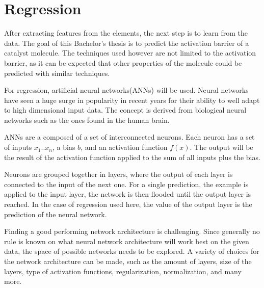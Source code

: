 
\chapter{Regression}
\label{ch:Regression}

After extracting features from the elements, the next step is to learn from the data.
The goal of this Bachelor's thesis is to predict the activation barrier of a catalyst molecule.
The techniques used however are not limited to the activation barrier, 
as it can be expected that other properties of the molecule could be predicted with similar techniques.

For regression, artificial neural networks(ANNs) will be used.
Neural networks have seen a huge surge in popularity in recent years for their ability to well
adapt to high dimensional input data.
The concept is derived from biological neural networks such as the ones found in the human brain.

ANNs are a composed of a set of interconnected neurons.
Each neuron has a set of inputs $x_1 .. x_n$, a bias $b$, and an activation function $f(x)$.
The output will be the result of the activation function applied to the sum of all inputs plus the bias.

Neurons are grouped together in layers, where the output of each layer is connected to the input of the next one.
For a single prediction, the example is applied to the input layer, the network is then flooded until the output layer is reached.
In the case of regression used here, the value of the output layer is the prediction of the neural network.

Finding a good performing network architecture is challenging. 
Since generally no rule is known on what neural network architecture will work best on the given data, the space of possible networks needs to be explored.
A variety of choices for the network architecture can be made, such as the amount of layers, size of the layers, type of activation functions, regularization, normalization, and many more.

